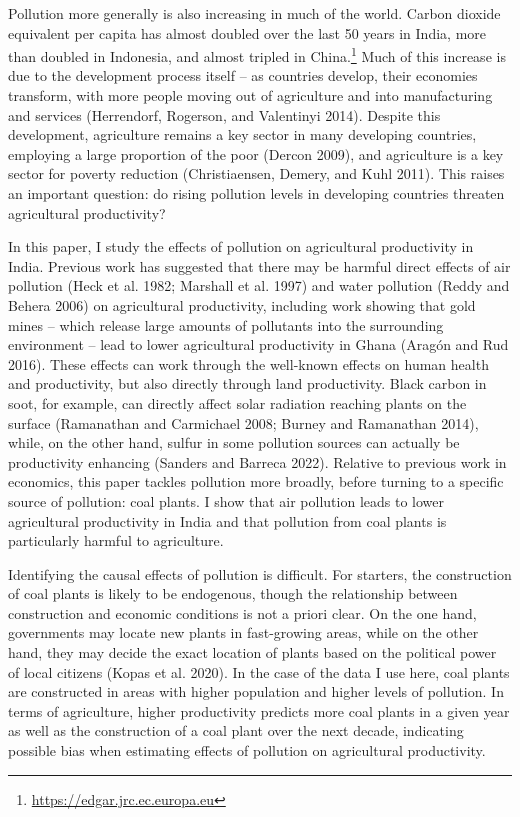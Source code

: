 \documentclass[
]{article}
\begin{document}
Pollution more generally is also increasing in much of the world. Carbon dioxide equivalent per capita has almost doubled over the last 50 years in India, more than doubled in Indonesia, and almost tripled in China.\footnote{\url{https://edgar.jrc.ec.europa.eu}} Much of this increase is due to the development process itself -- as countries develop, their economies transform, with more people moving out of agriculture and into manufacturing and services (Herrendorf, Rogerson, and Valentinyi 2014). Despite this development, agriculture remains a key sector in many developing countries, employing a large proportion of the poor (Dercon 2009), and agriculture is a key sector for poverty reduction (Christiaensen, Demery, and Kuhl 2011). This raises an important question: do rising pollution levels in developing countries threaten agricultural productivity?

In this paper, I study the effects of pollution on agricultural productivity in India. Previous work has suggested that there may be harmful direct effects of air pollution (Heck et al. 1982; Marshall et al. 1997) and water pollution (Reddy and Behera 2006) on agricultural productivity, including work showing that gold mines -- which release large amounts of pollutants into the surrounding environment -- lead to lower agricultural productivity in Ghana (Aragón and Rud 2016). These effects can work through the well-known effects on human health and productivity, but also directly through land productivity. Black carbon in soot, for example, can directly affect solar radiation reaching plants on the surface (Ramanathan and Carmichael 2008; Burney and Ramanathan 2014), while, on the other hand, sulfur in some pollution sources can actually be productivity enhancing (Sanders and Barreca 2022). Relative to previous work in economics, this paper tackles pollution more broadly, before turning to a specific source of pollution: coal plants. I show that air pollution leads to lower agricultural productivity in India and that pollution from coal plants is particularly harmful to agriculture.

Identifying the causal effects of pollution is difficult. For starters, the construction of coal plants is likely to be endogenous, though the relationship between construction and economic conditions is not a priori clear. On the one hand, governments may locate new plants in fast-growing areas, while on the other hand, they may decide the exact location of plants based on the political power of local citizens (Kopas et al. 2020). In the case of the data I use here, coal plants are constructed in areas with higher population and higher levels of pollution. In terms of agriculture, higher productivity predicts more coal plants in a given year as well as the construction of a coal plant over the next decade, indicating possible bias when estimating effects of pollution on agricultural productivity.
\end{document}
